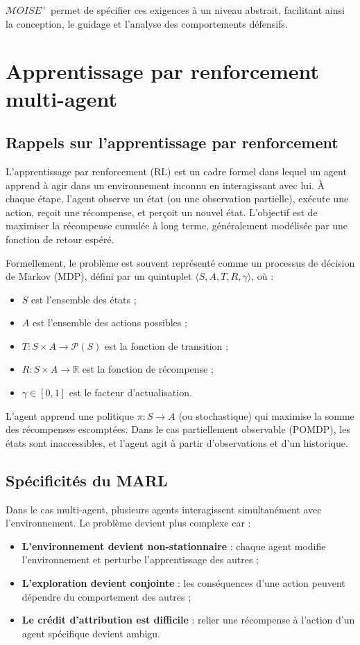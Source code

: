 $\mathcal{M}OISE^+$ permet de spécifier ces exigences à un niveau abstrait, facilitant ainsi la conception, le guidage et l'analyse des comportements défensifs.

\section{Apprentissage par renforcement multi-agent}

\subsection{Rappels sur l'apprentissage par renforcement}

L'apprentissage par renforcement (\ac{RL}) est un cadre formel dans lequel un agent apprend à agir dans un environnement inconnu en interagissant avec lui. À chaque étape, l'agent observe un état (ou une observation partielle), exécute une action, reçoit une récompense, et perçoit un nouvel état. L'objectif est de maximiser la récompense cumulée à long terme, généralement modélisée par une fonction de retour espéré.

Formellement, le problème est souvent représenté comme un processus de décision de Markov (\ac{MDP}), défini par un quintuplet $\langle S, A, T, R, \gamma \rangle$, où :
\begin{itemize}
    \item $S$ est l'ensemble des états ;
    \item $A$ est l'ensemble des actions possibles ;
    \item $T: S \times A \rightarrow \mathcal{P}(S)$ est la fonction de transition ;
    \item $R: S \times A \rightarrow \mathbb{R}$ est la fonction de récompense ;
    \item $\gamma \in [0,1]$ est le facteur d'actualisation.
\end{itemize}

L'agent apprend une politique $\pi : S \rightarrow A$ (ou stochastique) qui maximise la somme des récompenses escomptées. Dans le cas partiellement observable (\ac{POMDP}), les états sont inaccessibles, et l'agent agit à partir d'observations et d'un historique.

\subsection{Spécificités du MARL}

Dans le cas multi-agent, plusieurs agents interagissent simultanément avec l'environnement. Le problème devient plus complexe car :
\begin{itemize}
    \item \textbf{L'environnement devient non-stationnaire} : chaque agent modifie l'environnement et perturbe l'apprentissage des autres ;
    \item \textbf{L'exploration devient conjointe} : les conséquences d'une action peuvent dépendre du comportement des autres ;
    \item \textbf{Le crédit d'attribution est difficile} : relier une récompense à l'action d'un agent spécifique devient ambigu.
\end{itemize}

